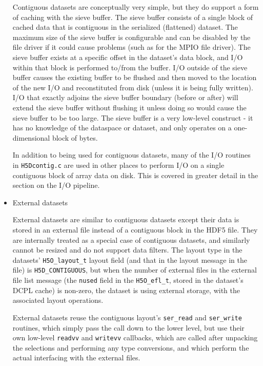 \begin{itemize}
Contiguous datasets are conceptually very simple, but they do support a form of caching with the sieve buffer. The sieve buffer consists of a single block of cached data that is contiguous in the serialized (flattened) dataset. The maximum size of the sieve buffer is configurable and can be disabled by the file driver if it could cause problems (such as for the MPIO file driver). The sieve buffer exists at a specific offset in the dataset's data block, and I/O within that block is performed to/from the buffer. I/O outside of the sieve buffer causes the existing buffer to be flushed and then moved to the location of the new I/O and reconstituted from disk (unless it is being fully written). I/O that exactly adjoins the sieve buffer boundary (before or after) will extend the sieve buffer without flushing it unless doing so would cause the sieve buffer to be too large. The sieve buffer is a very low-level construct - it has no knowledge of the dataspace or dataset, and only operates on a one-dimensional block of bytes.

In addition to being used for contiguous datasets, many of the I/O routines in \texttt{H5Dcontig.c} are used in other places to perform I/O on a single contiguous block of array data on disk. This is covered in greater detail in the section on the I/O pipeline.

    \item External datasets

External datasets are similar to contiguous datasets except their data is stored in an external file instead of a contiguous block in the HDF5 file. They are internally treated as a special case of contiguous datasets, and similarly cannot be resized and do not support data filters. The layout type in the datasets' \texttt{H5O\_layout\_t} layout field (and that in the layout message in the file) is \texttt{H5D\_CONTIGUOUS}, but when the number of external files in the external file list message (the \texttt{nused} field in the \texttt{H5O\_efl\_t}, stored in the dataset's DCPL cache) is non-zero, the dataset is using external storage, with the associated layout operations.

External datasets reuse the contiguous layout's \texttt{ser\_read} and \texttt{ser\_write} routines, which simply pass the call down to the lower level, but use their own low-level \texttt{readvv} and \texttt{writevv} callbacks, which are called after unpacking the selections and performing any type conversions, and which perform the actual interfacing with the external files.


\end{itemize}
